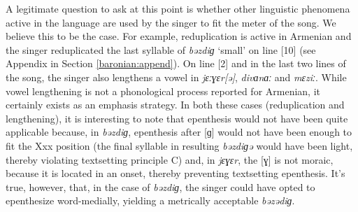 \documentclass[output=paper,colorlinks,citecolor=brown]{langscibook}
\begin{document}
A legitimate question to ask at this point is whether other linguistic phenomena active in the language are used by the singer to fit the meter of the song.  We believe this to be the case.  For example, reduplication is active in Armenian \citep{Vaux1998} and the singer reduplicated the last syllable of \textit{bəzdiɡ} ‘small’ on line [10] (see Appendix in Section \ref{baronian:append}).  On line [2] and in the last two lines of the song, the singer also lengthens a vowel in \textit{jɛːɣɛr[ə]}, \textit{divɑnɑː} and \textit{mɛziː}.  While vowel lengthening is not a phonological process reported for Armenian, it certainly exists as an emphasis strategy.  In both these cases (reduplication and lengthening), it is interesting to note that epenthesis would not have been quite applicable because, in \textit{bəzdiɡ}, epenthesis after [ɡ] would not have been enough to fit the Xxx position (the final syllable in resulting \textit{bəzdiɡə} would have been light, thereby violating textsetting principle C) and, in \textit{jɛɣɛr}, the [ɣ] is not moraic, because it is located in an onset, thereby preventing textsetting epenthesis.  It’s true, however, that, in the case of \textit{bəzdiɡ}, the singer could have opted to epenthesize word\hyp medially, yielding a metrically acceptable \textit{bəzədiɡ}.
\end{document}
